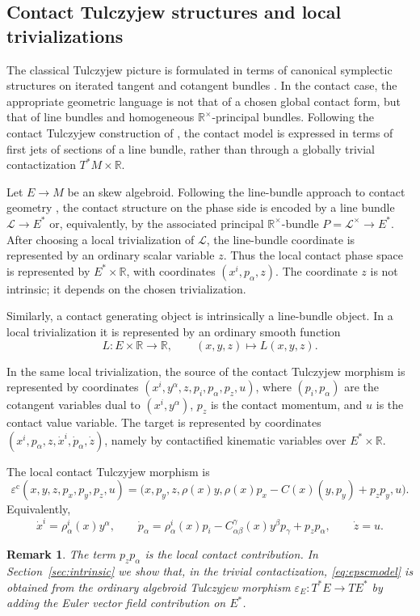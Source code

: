 \documentclass[11pt]{article}
\newtheorem{remark}[theorem]{Remark}
\newcommand{\R}{\mathbb{R}}
\newcommand{\epsc}{\varepsilon^{\mathrm c}}
\begin{document}
\subsection{Contact Tulczyjew structures and local trivializations}
\label{sec:contact-structure-local}

The classical Tulczyjew picture is formulated in terms of canonical symplectic
structures on iterated tangent and cotangent bundles \cite{Tulczyjew1976}. In the
contact case, the appropriate geometric language is not that of a chosen global
contact form, but that of line bundles and homogeneous
\(\mathbb R^\times\)-principal bundles. Following the contact Tulczyjew
construction of \cite{GG2024}, the contact model is expressed in terms of first
jets of sections of a line bundle, rather than through a globally trivial
contactization \(T^*M\times\mathbb R\).

Let \(E \to M\) be an skew algebroid. Following the line-bundle approach to
contact geometry \cite{GG2024}, the contact structure on the phase side is encoded
by a line bundle $\mathcal L \rightarrow E^*$ or, equivalently, by the associated principal \(\mathbb R^\times\)-bundle $P=\mathcal L^\times\rightarrow E^*$.
After choosing a local trivialization of \(\mathcal L\), the line-bundle coordinate
is represented by an ordinary scalar variable \(z\). Thus the local contact phase
space is represented by \(E^*\times\mathbb R\), with coordinates
\((x^i,p_\alpha,z)\). The coordinate \(z\) is not intrinsic; it depends on the
chosen trivialization.

Similarly, a contact generating object is intrinsically a line-bundle
object. In a local trivialization it is represented by an ordinary smooth
function
\[
        L:E\times\R\rightarrow \R,
        \qquad
        (x,y,z)\mapsto L(x,y,z).
\]


In the same local trivialization, the source of the contact Tulczyjew morphism is represented by coordinates $(x^i,y^\alpha,z,p_i,p_\alpha,p_z,u)$, where \((p_i,p_\alpha)\) are the cotangent variables dual to
\((x^i,y^\alpha)\), \(p_z\) is the contact momentum, and \(u\) is the
contact value variable. The target is represented by coordinates
$(x^i,p_\alpha,z,\dot x^i,\dot p_\alpha,\dot z)$, namely by contactified kinematic variables over \(E^*\times\R\).

The local contact Tulczyjew morphism is
\begin{equation}
\epsc(x,y,z,p_x,p_y,p_z,u)
=
\bigl(
 x,p_y,z,
 \rho(x)y,
 \rho(x)p_x-C(x)(y,p_y)+p_zp_y,
 u
\bigr).
\label{eq:epscmodel}
\end{equation}
Equivalently,
\[
        \dot x^i
        =
        \rho^i_{\alpha}(x)y^\alpha,
        \qquad
        \dot p_\alpha
        =
        \rho^i_{\alpha}(x)p_i
        -
        C^\gamma_{\alpha\beta}(x)y^\beta p_\gamma
        +
        p_zp_\alpha,
        \qquad
        \dot z=u .
\]
\begin{remark}
The term \(p_zp_\alpha\) is the local contact contribution. In
Section~\ref{sec:intrinsic} we show that, in the trivial
contactization, \eqref{eq:epscmodel} is obtained from the ordinary
algebroid Tulczyjew morphism \(\varepsilon_E:T^*E\to TE^*\) by adding the
Euler vector field contribution on \(E^*\).
\end{remark}
\end{document}
